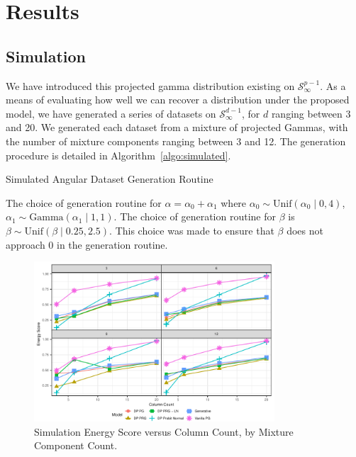
\section{Results}

\subsection{Simulation}
We have introduced this projected gamma distribution existing on $\mathcal{S}_{\infty}^{p-1}$.  As a
  means of evaluating how well we can recover a distribution under the proposed model, we have
  generated a series of datasets on $\mathcal{S}_{\infty}^{d-1}$, for $d$ ranging between 3 and 20.
  We generated each dataset from a mixture of projected Gammas, with the number of mixture components
  ranging between 3 and 12.  The generation procedure is detailed in Algorithm~\ref{algo:simulated}.
  \begin{algorithm}[htb]
    \caption{Simulated Angular Dataset Generation Routine\label{algo:simulated}}
  \end{algorithm}
  The choice of generation routine for $\alpha = \alpha_0 + \alpha_1$ where
  $\alpha_0 \sim \text{Unif}(\alpha_0\mid 0,4)$, $\alpha_1\sim \text{Gamma}(\alpha_1\mid 1,1)$.
  The choice of generation routine for $\beta$ is $\beta\sim\text{Unif}(\beta\mid 0.25, 2.5)$.
  This choice was made to ensure that $\beta$ does not approach 0 in the generation routine.

\begin{figure}[ht]
  \caption{Simulation Energy Score versus Column Count, by Mixture Component Count.\label{fig:simes}}
  \centering
  \includegraphics[width=0.8\textwidth]{./images/simulation_es}
\end{figure}

